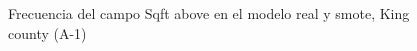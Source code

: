 \begin{figure}[H]
    \centering
    
    \caption{Frecuencia del campo Sqft above en el modelo real y smote, King county (A-1)}
    \label{frecuency-smote-sqft above}
\end{figure}